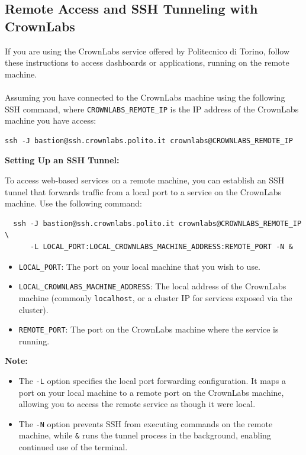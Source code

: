 \documentclass{article}
\begin{document}
\subsection{Remote Access and SSH Tunneling with CrownLabs}

If you are using the CrownLabs service offered by Politecnico di Torino, follow these instructions to access dashboards or applications, running on the remote machine.
\\\\
Assuming you have connected to the CrownLabs machine using the following SSH command, where \texttt{CROWNLABS\_REMOTE\_IP} is the IP address of the CrownLabs machine you have access:
  \begin{lstlisting}
ssh -J bastion@ssh.crownlabs.polito.it crownlabs@CROWNLABS_REMOTE_IP
  \end{lstlisting}

  \textbf{Setting Up an SSH Tunnel:}

  To access web-based services on a remote machine, you can establish an SSH tunnel that forwards traffic from a local port to a service on the CrownLabs machine. Use the following command:
  
  \begin{lstlisting}
  ssh -J bastion@ssh.crownlabs.polito.it crownlabs@CROWNLABS_REMOTE_IP \
      -L LOCAL_PORT:LOCAL_CROWNLABS_MACHINE_ADDRESS:REMOTE_PORT -N &
  \end{lstlisting}
  
  \begin{itemize}
      \item \texttt{LOCAL\_PORT}: The port on your local machine that you wish to use.
      \item \texttt{LOCAL\_CROWNLABS\_MACHINE\_ADDRESS}: The local address of the CrownLabs machine (commonly \texttt{localhost}, or a cluster IP for services exposed via the cluster).
      \item \texttt{REMOTE\_PORT}: The port on the CrownLabs machine where the service is running.
  \end{itemize}
  
  \vspace{0.2cm}
  
  \textbf{Note:} 
  \begin{itemize}
      \item The \texttt{-L} option specifies the local port forwarding configuration. It maps a port on your local machine to a remote port on the CrownLabs machine, allowing you to access the remote service as though it were local.
      \item The \texttt{-N} option prevents SSH from executing commands on the remote machine, while \texttt{\&} runs the tunnel process in the background, enabling continued use of the terminal.
  \end{itemize}
  
\end{document}
